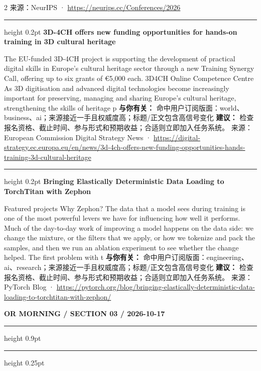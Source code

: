 \documentclass[10.5pt]{ctexart}
\begin{document}
\begin{multicols}{2}
{\footnotesize\color{ormuted} 来源：NeurIPS · \url{https://neurips.cc/Conferences/2026}}
\vspace{2mm}
\hrule height 0.2pt
\vspace{2mm}
{\large\bfseries 3D-4CH offers new funding opportunities for hands-on training in 3D cultural heritage}\par
The EU-funded 3D-4CH project is supporting the development of practical digital skills in Europe's cultural heritage sector through a new Training Synergy Call, offering up to six grants of €5,000 each. 3D4CH Online Competence Centre As 3D digitisation and advanced digital technologies become increasingly important for preserving, managing and sharing Europe's cultural heritage, strengthening the skills of heritage p
\textbf{与你有关：} 命中用户订阅版面：world、business、ai；来源接近一手且权威度高；标题/正文包含高信号变化
\textbf{建议：} 检查报名资格、截止时间、参与形式和预期收益；合适则立即加入任务系统。
{\footnotesize\color{ormuted} 来源：European Commission Digital Strategy News · \url{https://digital-strategy.ec.europa.eu/en/news/3d-4ch-offers-new-funding-opportunities-hands-training-3d-cultural-heritage}}
\vspace{2mm}
\hrule height 0.2pt
\vspace{2mm}
{\large\bfseries Bringing Elastically Deterministic Data Loading to TorchTitan with Zephon}\par
Featured projects Why Zephon? The data that a model sees during training is one of the most powerful levers we have for influencing how well it performs. Much of the day-to-day work of improving a model happens on the data side: we change the mixture, or the filters that we apply, or how we tokenize and pack the samples, and then we run an ablation experiment to see whether the change helped. The first problem with t
\textbf{与你有关：} 命中用户订阅版面：engineering、ai、research；来源接近一手且权威度高；标题/正文包含高信号变化
\textbf{建议：} 检查报名资格、截止时间、参与形式和预期收益；合适则立即加入任务系统。
{\footnotesize\color{ormuted} 来源：PyTorch Blog · \url{https://pytorch.org/blog/bringing-elastically-deterministic-data-loading-to-torchtitan-with-zephon/}}
\end{multicols}
\newpage
{\small\bfseries OR MORNING / SECTION 03 / 2026-10-17}
\vspace{2mm}
\hrule height 0.9pt
\vspace{1.5mm}
\hrule height 0.25pt
\vspace{4mm}
\end{document}
